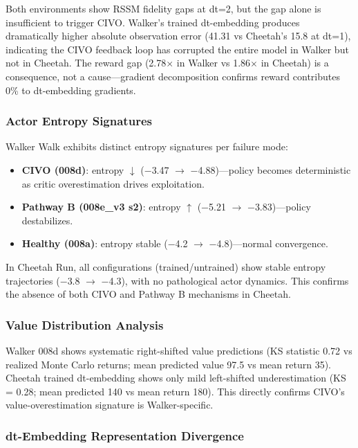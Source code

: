 \documentclass[10pt,letterpaper]{article}
\begin{document}
Both environments show RSSM fidelity gaps at dt=2, but the gap alone is insufficient to trigger CIVO. Walker's trained dt-embedding produces dramatically higher absolute observation error (41.31 vs Cheetah's 15.8 at dt=1), indicating the CIVO feedback loop has corrupted the entire model in Walker but not in Cheetah. The reward gap (2.78$\times$ in Walker vs 1.86$\times$ in Cheetah) is a consequence, not a cause---gradient decomposition confirms reward contributes 0\% to dt-embedding gradients.

\subsubsection{Actor Entropy Signatures}

Walker Walk exhibits distinct entropy signatures per failure mode:
\begin{itemize}
    \item \textbf{CIVO (008d)}: entropy $\downarrow$ ($-$3.47 $\rightarrow$ $-$4.88)---policy becomes deterministic as critic overestimation drives exploitation.
    \item \textbf{Pathway B (008e\_v3 s2)}: entropy $\uparrow$ ($-$5.21 $\rightarrow$ $-$3.83)---policy destabilizes.
    \item \textbf{Healthy (008a)}: entropy stable ($-$4.2 $\rightarrow$ $-$4.8)---normal convergence.
\end{itemize}

In Cheetah Run, all configurations (trained/untrained) show stable entropy trajectories ($-$3.8 $\rightarrow$ $-$4.3), with no pathological actor dynamics. This confirms the absence of both CIVO and Pathway B mechanisms in Cheetah.

\subsubsection{Value Distribution Analysis}

Walker 008d shows systematic right-shifted value predictions (KS statistic 0.72 vs realized Monte Carlo returns; mean predicted value 97.5 vs mean return 35). Cheetah trained dt-embedding shows only mild left-shifted underestimation (KS = 0.28; mean predicted 140 vs mean return 180). This directly confirms CIVO's value-overestimation signature is Walker-specific.

\subsubsection{dt-Embedding Representation Divergence}
\end{document}
